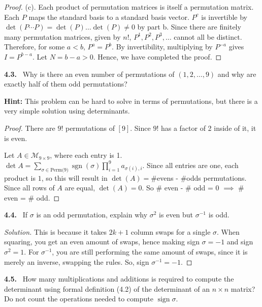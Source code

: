 \documentclass[12pt]{amsart}
\newcommand{\inv}{^{-1}}                    %
\DeclareMathOperator{\sgn}{sgn}
\theoremstyle{plain}
\theoremstyle{definition}
\theoremstyle{remark}
\newenvironment{problem}[1]{\par\medskip\noindent\textbf{#1.}\ }{\par\smallskip}
\newenvironment{solution}{\begin{proof}[Solution]}{\end{proof}}
\begin{document}
\begin{proof}
    (c). Each product of permutation matrices is itself a permutation matrix. Each $P$ maps the standard basis to a standard basis vector. $P^c$ is invertible by $\det(P\cdots P) = \det(P)\ldots \det(P) \neq 0$ by part b. Since there are finitely many permutation matrices, given by $n!$, $P^1, P^2, P^3,\ldots$ cannot all be distinct. Therefore, for some $a < b$, $P^a = P^b$. By invertibility, multiplying by $P^{-a}$ gives $I = P^{b-a}$. Let $N = b-a > 0$. Hence, we have completed the proof.
\end{proof}

\begin{problem}{4.3}
Why is there an even number of permutations of $(1,2,\dots,9)$ and why are exactly half of them odd permutations?

\noindent\textbf{Hint:} This problem can be hard to solve in terms of permutations, but there is a very simple solution using determinants.
\end{problem}

\begin{proof}
    There are $9!$ permutations of $[9]$. Since $9!$ has a factor of 2 inside of it, it is even.

    Let $A \in \mathcal{M}_{9\times9}$, where each entry is 1. $\det A = \sum_{\sigma \in \text{Perm(9)}} \sgn(\sigma)\prod_{i=1}^{9}a_{\sigma(i),i}$. Since all entries are one, each product is $1$, so this will result in $\det(A) = \#$evens - $\#$odds permutations. Since all rows of $A$ are equal, $\det(A) = 0$. So $\#$ even - $\#$ odd = 0 $\implies$ $\#$ even = $\#$ odd.
\end{proof}

\begin{problem}{4.4}
If $\sigma$ is an odd permutation, explain why $\sigma^2$ is even but $\sigma\inv$ is odd.
\end{problem}

\begin{solution}
    This is because it takes $2k+1$ column swaps for a single $\sigma$. When squaring, you get an even amount of swaps, hence making  sign $\sigma = -1$ and sign $\sigma^{2} =1$. For $\sigma^{-1}$, you are still performing the same amount of swaps, since it is merely an inverse, swapping the rules. So, sign $\sigma^{-1}=-1$.
\end{solution}
\begin{problem}{4.5}
How many multiplications and additions is required to compute the determinant using formal definition (4.2) of the determinant of an $n\times n$ matrix? Do not count the operations needed to compute $\operatorname{sign}\sigma$.
\end{problem}
\end{document}
